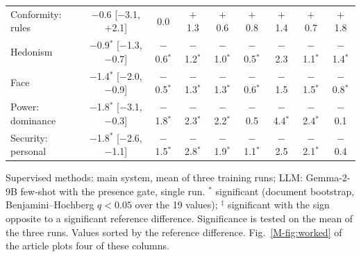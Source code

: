 \begin{table}[t]
\begin{tabular*}{\textwidth}{@{\extracolsep{\fill}}lcccccccc@{}}
Conformity: rules & $-$0.6 [$-$3.1, $+$2.1] & 0.0 & $+$1.3 & $+$0.6 & $+$0.8 & $+$1.4 & $+$0.7 & $+$1.8 \\
Hedonism & $-$0.9$^*$ [$-$1.3, $-$0.7] & $-$0.6$^*$ & $-$1.2$^*$ & $-$1.0$^*$ & $-$0.5$^*$ & $-$2.3 & $-$1.1$^*$ & $-$1.4$^*$ \\
Face & $-$1.4$^*$ [$-$2.0, $-$0.9] & $-$0.5$^*$ & $-$1.3$^*$ & $-$1.3$^*$ & $-$0.6$^*$ & $-$1.5 & $-$1.5$^*$ & $-$0.8$^*$ \\
Power: dominance & $-$1.8$^*$ [$-$3.1, $-$0.3] & $-$1.8$^*$ & $-$2.3$^*$ & $-$2.2$^*$ & $-$0.5 & $-$4.4$^*$ & $-$2.4$^*$ & $-$0.1 \\
Security: personal & $-$1.8$^*$ [$-$2.6, $-$1.1] & $-$1.5$^*$ & $-$2.8$^*$ & $-$1.9$^*$ & $-$1.1$^*$ & $-$2.5 & $-$2.1$^*$ & $-$0.4 \\
\bottomrule
\end{tabular*}
\par\vspace{2pt}
\begin{minipage}{\textwidth}\scriptsize Supervised methods: main system, mean of three training runs; LLM: Gemma-2-9B few-shot with the presence gate, single run. $^*$ significant (document bootstrap, Benjamini--Hochberg $q < 0.05$ over the 19 values); $^\ddagger$ significant with the sign opposite to a significant reference difference. Significance is tested on the mean of the three runs. Values sorted by the reference difference. Fig.~\ref{M-fig:worked} of the article plots four of these columns.\end{minipage}
\end{table}
